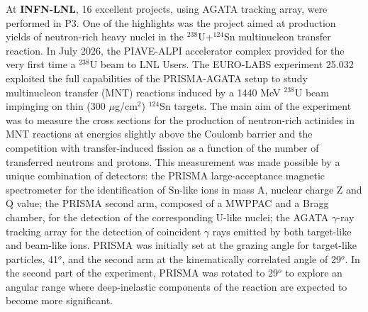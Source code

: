 At \textbf{INFN-LNL}, 16 excellent projects, using AGATA tracking array, were performed in P3. One of the highlights was the project aimed at production yields of neutron-rich heavy nuclei in the $^{238}$U+$^{124}$Sn multinucleon transfer reaction.
In July 2026, the PIAVE-ALPI accelerator complex provided for the very first time a $^{238}$U beam to LNL Users. The EURO-LABS experiment 25.032 exploited the full capabilities of the PRISMA-AGATA setup to study multinucleon transfer (MNT) reactions induced by a 1440 MeV $^{238}$U beam impinging on thin (300 $\mu$g/cm$^{2}$) $^{124}$Sn targets.
The main aim of the experiment was to measure the cross sections for the production of neutron-rich actinides in MNT reactions at energies slightly above the Coulomb barrier and the competition with transfer-induced fission as a function of the number of transferred neutrons and protons. This measurement was made possible by a unique combination of detectors: the PRISMA large-acceptance magnetic spectrometer for the identification of Sn-like ions in mass A, nuclear charge Z and Q value; the PRISMA second arm, composed of a MWPPAC and a Bragg chamber, for the detection of the corresponding U-like nuclei; the AGATA $\gamma$-ray tracking array for the detection of coincident $\gamma$ rays emitted by both target-like and beam-like ions. PRISMA was initially set at the grazing angle for target-like particles, 41$^o$, and the second arm at the kinematically correlated angle of 29$^o$. In the second part of the experiment, PRISMA was rotated to 29$^o$ to explore an angular range where deep-inelastic components of the reaction are expected to become more significant.


